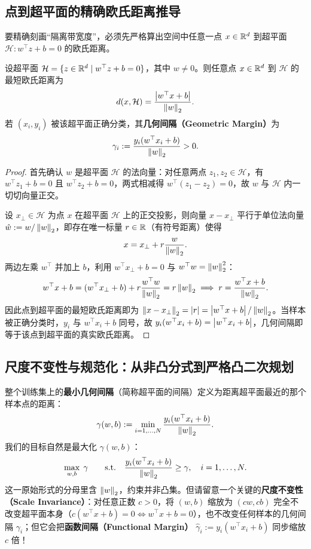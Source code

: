 \subsection{点到超平面的精确欧氏距离推导}

要精确刻画“隔离带宽度”，必须先严格算出空间中任意一点 $x \in \mathbb{R}^d$ 到超平面 $\mathcal{H}: w^\top z + b = 0$ 的欧氏距离。

\begin{thmBox}
\begin{proposition}[点到超平面的有符号与无符号距离]\label{prop:svm-dist}
设超平面 $\mathcal{H} = \{z \in \mathbb{R}^d \mid w^\top z + b = 0\}$，其中 $w \neq 0$。则任意点 $x \in \mathbb{R}^d$ 到 $\mathcal{H}$ 的最短欧氏距离为
\begin{equation}\label{eq:point-plane-dist}
  d(x, \mathcal{H}) = \frac{\left|w^\top x + b\right|}{\left\|w\right\|_2}.
\end{equation}
若 $(x_i, y_i)$ 被该超平面正确分类，其\textbf{几何间隔（Geometric Margin）}为
\[
  \gamma_i := \frac{y_i(w^\top x_i + b)}{\left\|w\right\|_2} > 0.
\]
\end{proposition}
\end{thmBox}

\begin{proof}
首先确认 $w$ 是超平面 $\mathcal{H}$ 的法向量：对任意两点 $z_1, z_2 \in \mathcal{H}$，有 $w^\top z_1 + b = 0$ 且 $w^\top z_2 + b = 0$，两式相减得 $w^\top (z_1 - z_2) = 0$，故 $w$ 与 $\mathcal{H}$ 内一切切向量正交。

设 $x_\perp \in \mathcal{H}$ 为点 $x$ 在超平面 $\mathcal{H}$ 上的正交投影，则向量 $x - x_\perp$ 平行于单位法向量 $\hat{w} := w / \left\|w\right\|_2$，即存在唯一标量 $r \in \mathbb{R}$（有符号距离）使得
\[
  x = x_\perp + r \frac{w}{\left\|w\right\|_2}.
\]
两边左乘 $w^\top$ 并加上 $b$，利用 $w^\top x_\perp + b = 0$ 与 $w^\top w = \left\|w\right\|_2^2$：
\[
  w^\top x + b = (w^\top x_\perp + b) + r \frac{w^\top w}{\left\|w\right\|_2} = r \left\|w\right\|_2 \implies r = \frac{w^\top x + b}{\left\|w\right\|_2}.
\]
因此点到超平面的最短欧氏距离即为 $\left\|x - x_\perp\right\|_2 = \left|r\right| = \left|w^\top x + b\right|/\left\|w\right\|_2$。当样本被正确分类时，$y_i$ 与 $w^\top x_i + b$ 同号，故 $y_i(w^\top x_i + b) = \left|w^\top x_i + b\right|$，几何间隔即等于该点到超平面的真实欧氏距离。
\end{proof}

\subsection{尺度不变性与规范化：从非凸分式到严格凸二次规划}

整个训练集上的\textbf{最小几何间隔}（简称超平面的间隔）定义为距离超平面最近的那个样本点的距离：
\[
  \gamma(w, b) := \min_{i=1,\dots,N} \frac{y_i(w^\top x_i + b)}{\left\|w\right\|_2}.
\]
我们的目标自然是最大化 $\gamma(w, b)$：
\[
  \max_{w, b} \;\gamma \qquad \text{s.t.}\quad \frac{y_i(w^\top x_i + b)}{\left\|w\right\|_2} \ge \gamma,\quad i=1,\dots,N.
\]
这一原始形式的分母里含 $\left\|w\right\|_2$，约束并非凸集。但请留意一个关键的\textbf{尺度不变性（Scale Invariance）}：对任意正数 $c > 0$，将 $(w, b)$ 缩放为 $(cw, cb)$ 完全不改变超平面本身（$c(w^\top x + b) = 0 \iff w^\top x + b = 0$），也不改变任何样本的几何间隔 $\gamma_i$；但它会把\textbf{函数间隔（Functional Margin）} $\hat{\gamma}_i := y_i(w^\top x_i + b)$ 同步缩放 $c$ 倍！

